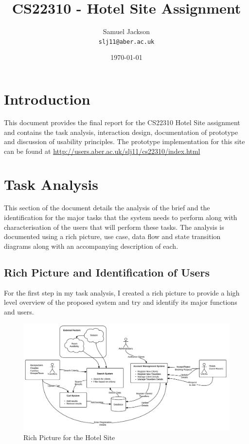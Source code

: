 \documentclass{article}
\begin{document}
\title{CS22310 - Hotel Site Assignment}
\author{Samuel Jackson \\ \texttt{slj11@aber.ac.uk}}
\date{\today}
\maketitle

\section{Introduction}
This document provides the final report for the CS22310 Hotel Site assignment and contains the task analysis, interaction design, documentation of prototype and discussion of usability principles. The prototype implementation for this site can be found at \url{http://users.aber.ac.uk/slj11/cs22310/index.html}

\section{Task Analysis}
This section of the document details the analysis of the brief and the identification for the major tasks that the system needs to perform along with characterisation of the users that will perform these tasks. The analysis is documented using a rich picture, use case, data flow and state transition diagrams along with an accompanying description of each.

\subsection{Rich Picture and Identification of Users}
For the first step in my task analysis, I created a rich picture to provide a high level overview of the proposed system and try and identify its major functions and users.

\begin{figure}[H]
\centering
\includegraphics[width=1\textwidth]{img/richpic.png}
\caption{Rich Picture for the Hotel Site}
\label{fig:rich-pic}
\end{figure}
\end{document}
